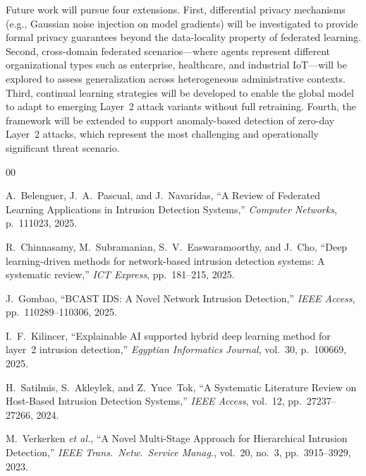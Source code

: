 \documentclass[conference]{IEEEtran}
\begin{document}
Future work will pursue four extensions.
First, differential privacy mechanisms (e.g., Gaussian noise injection on model
gradients) will be investigated to provide formal privacy guarantees beyond the
data-locality property of federated learning.
Second, cross-domain federated scenarios---where agents represent different
organizational types such as enterprise, healthcare, and industrial IoT---will be
explored to assess generalization across heterogeneous administrative contexts.
Third, continual learning strategies will be developed to enable the global model
to adapt to emerging Layer~2 attack variants without full retraining.
Fourth, the framework will be extended to support anomaly-based detection of
zero-day Layer~2 attacks, which represent the most challenging and operationally
significant threat scenario.

\begin{thebibliography}{00}

A.~Belenguer, J.~A.~Pascual, and J.~Navaridas,
``A Review of Federated Learning Applications in Intrusion Detection Systems,''
\textit{Computer Networks}, p.~111023, 2025.

R.~Chinnasamy, M.~Subramanian, S.~V.~Easwaramoorthy, and J.~Cho,
``Deep learning-driven methods for network-based intrusion detection systems:
A systematic review,''
\textit{ICT Express}, pp.~181--215, 2025.

J.~Gombao,
``BCAST IDS: A Novel Network Intrusion Detection,''
\textit{IEEE Access}, pp.~110289--110306, 2025.

I.~F.~Kilincer,
``Explainable AI supported hybrid deep learning method for layer~2 intrusion
detection,''
\textit{Egyptian Informatics Journal}, vol.~30, p.~100669, 2025.

H.~Satilmis, S.~Akleylek, and Z.~Yuce~Tok,
``A Systematic Literature Review on Host-Based Intrusion Detection Systems,''
\textit{IEEE Access}, vol.~12, pp.~27237--27266, 2024.

M.~Verkerken \textit{et al.},
``A Novel Multi-Stage Approach for Hierarchical Intrusion Detection,''
\textit{IEEE Trans.\ Netw.\ Service Manag.}, vol.~20, no.~3,
pp.~3915--3929, 2023.

\end{thebibliography}
\end{document}
